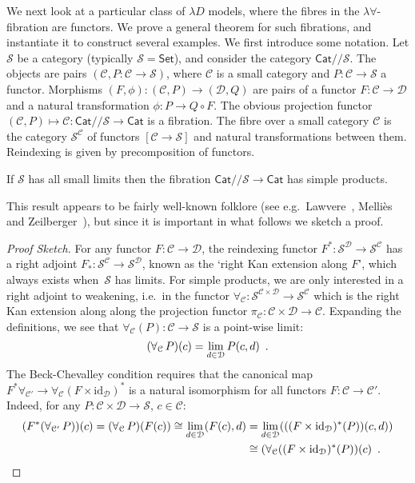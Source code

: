 \documentclass[a4paper,UKenglish]{lipics}
\theoremstyle{plain}
\newcommand{\msf}[1]{\mathsf{#1}} %
\newcommand{\Set}{\msf{Set}}
\newcommand{\Cat}{\msf{Cat}}
\newcommand{\C}{\mathcal{C}}
\newcommand{\D}{\mathcal{D}}
\newcommand{\lslice}{/\!/}
\newcommand{\id}{\mathrm{id}}
\begin{document}
We next look at a particular class of $\lambda D$ models, where the fibres in the $\lambda \forall$-fibration are functors. We prove a general theorem for such fibrations, and instantiate it to construct several examples. We first introduce some notation. Let $\mathcal S$ be a category (typically $\mathcal S=\Set$), and consider the category $\Cat\lslice\mathcal S$. The objects are pairs $(\C,P:\C\to \mathcal S)$, where $\C$ is a small category and $P:\C\to \mathcal S$ a functor.  Morphisms $(F,\phi):(\C,P)\to (\D,Q)$ are pairs of a functor $F:\C\to \D$ and a natural transformation $\phi : P \to Q \circ F$.  The obvious projection functor $(\C,P)\mapsto \C : \Cat\lslice \mathcal S\to \Cat$ is a fibration. The fibre over a small category $\C$ is the category $\mathcal S^{\mathcal C}$ of
functors $[\mathcal C\to\mathcal S]$ and natural transformations between them. Reindexing is given by precomposition of functors.
\begin{theorem}
\label{thm:BC}
If $\mathcal S$ has all small limits
then the fibration $\Cat\lslice \mathcal S\to \Cat$ has simple products.
\end{theorem}

This result appears to be fairly well-known folklore (see e.g.\ Lawvere~\cite[end of \S 3]{lawvere-adjointness}, Melli\`es and Zeilberger~\cite{mellies-zeilberger}), but since it is important in what follows we sketch a proof.

\begin{proof}[Proof Sketch]
For any functor $F:\C\to \D$, the reindexing functor $F^*:\mathcal S^\D\to \mathcal S^\C$ has a right adjoint $F_*:\mathcal S^\C\to\mathcal S^\D$, known as the `right Kan extension along $F$', which always exists when~$\mathcal S$ has limits. For simple products, we are only interested in a right adjoint to weakening, i.e.\ in the functor $\forall_\C:\mathcal S^{\C\times \D}\to \mathcal S^\C$ which is the right Kan extension along along the projection functor $\pi_\C:\C\times \D\to \C$. Expanding the definitions, we see that $\forall_\C(P):\C\to\mathcal S$ is a point-wise limit:
\begin{equation}
(\forall_\C\,P)(c)=\lim_{d\in \D}P(c,d)\enspace\text.
\label{eqn:forall-limit}
\end{equation}
The Beck-Chevalley condition requires that the canonical map
$
F^*\forall_{\C'}
\to
\forall_{\C}(F\times \id_\D)^*
$
is a natural isomorphism for all functors $F:\C\to \C'$. Indeed, for any $P:\C\times \D\to \mathcal S$, $c \in \C$:
\begin{align*}
(F^*(\forall_{\C'}\,P))(c)
 =
(\forall_{\C}\,P)(F(c))
\cong
\lim_{d\in \D}(F(c),d)
 & =
\lim_{d\in \D}(((F\times \id_\D)^*(P))(c,d)) \\
 & \cong
(\forall_{\C}((F\times \id_\D)^*(P))(c)
\enspace \text. \qedhere
\end{align*}
\end{proof}
\end{document}
